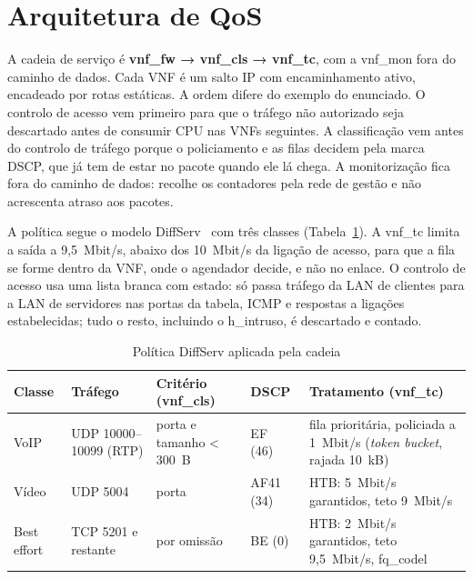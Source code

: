 \documentclass[11pt, a4paper]{article}
\begin{document}
\section{Arquitetura de QoS}
A cadeia de serviço é \textbf{vnf\_fw → vnf\_cls → vnf\_tc}, com a vnf\_mon fora do caminho de dados. Cada VNF é um salto IP com encaminhamento ativo, encadeado por rotas estáticas. A ordem difere do exemplo do enunciado. O controlo de acesso vem primeiro para que o tráfego não autorizado seja descartado antes de consumir CPU nas VNFs seguintes. A classificação vem antes do controlo de tráfego porque o policiamento e as filas decidem pela marca DSCP, que já tem de estar no pacote quando ele lá chega. A monitorização fica fora do caminho de dados: recolhe os contadores pela rede de gestão e não acrescenta atraso aos pacotes.

A política segue o modelo DiffServ~\cite{rfc2475, rfc2474} com três classes (Tabela~\ref{tab:diffserv}). A vnf\_tc limita a saída a 9,5~Mbit/s, abaixo dos 10~Mbit/s da ligação de acesso, para que a fila se forme dentro da VNF, onde o agendador decide, e não no enlace. O controlo de acesso usa uma lista branca com estado: só passa tráfego da LAN de clientes para a LAN de servidores nas portas da tabela, ICMP e respostas a ligações estabelecidas; tudo o resto, incluindo o h\_intruso, é descartado e contado.

\begin{table}[H]
\centering
\footnotesize
\caption{Política DiffServ aplicada pela cadeia}
\label{tab:diffserv}
\begin{tabular}{@{} >{\raggedright\arraybackslash}p{1.8cm} >{\raggedright\arraybackslash}p{2.6cm} >{\raggedright\arraybackslash}p{2.6cm} >{\raggedright\arraybackslash}p{1.6cm} >{\raggedright\arraybackslash}p{5.0cm} @{}}
\toprule
\textbf{Classe} & \textbf{Tráfego} & \textbf{Critério (vnf\_cls)} & \textbf{DSCP} & \textbf{Tratamento (vnf\_tc)} \\
\midrule
VoIP & UDP 10000--10099 (RTP) & porta e tamanho < 300~B & EF (46)~\cite{rfc3246} & fila prioritária, policiada a 1~Mbit/s (\textit{token bucket}, rajada 10~kB) \\
Vídeo & UDP 5004 & porta & AF41 (34)~\cite{rfc2597} & HTB: 5~Mbit/s garantidos, teto 9~Mbit/s \\
Best effort & TCP 5201 e restante & por omissão & BE (0) & HTB: 2~Mbit/s garantidos, teto 9,5~Mbit/s, fq\_codel~\cite{rfc8290} \\
\bottomrule
\end{tabular}
\end{table}
\end{document}
